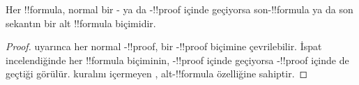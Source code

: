 \documentclass[../../../include/open-logic-section]{subfiles}
\begin{document}
\begin{cor}
Her !!{formula}, normal bir - ya da -!!{proof}
içinde geçiyorsa son-!!{formula} ya da son sekantın bir alt
!!{formula} biçimidir.
\end{cor}

\begin{proof}
   uyarınca her normal
  -!!{proof}, bir -!!{proof} biçimine çevrilebilir.
  İspat incelendiğinde her !!{formula} biçiminin,
  -!!{proof} içinde geçiyorsa -!!{proof} içinde de
  geçtiği görülür.
  \Cut{} kuralını içermeyen , alt-!!{formula} özelliğine
  sahiptir.
\end{proof}
\end{document}
